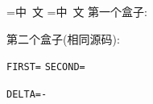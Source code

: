 \documentclass{article}
\begin{document}
=\hbox{中 文}%
=\hbox{中 文}%
第一个盒子: 

第二个盒子(相同源码): 

\medskip
\texttt{FIRST=\the{}}\quad
\texttt{SECOND=\the{}}

\texttt{DELTA=\the\dimexpr{}-\relax}
\end{document}
